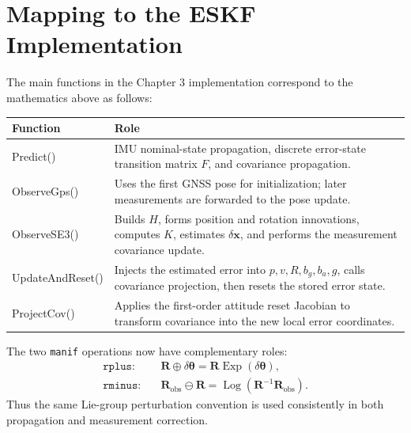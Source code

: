 \documentclass[11pt]{article}
\newcommand{\R}{\mathbf{R}}
\newcommand{\Exp}{\operatorname{Exp}}
\newcommand{\Log}{\operatorname{Log}}
\begin{document}
\section{Mapping to the ESKF Implementation}
The main functions in the Chapter 3 implementation correspond to the mathematics above as follows:
\begin{center}
\begin{tabular}{>{\ttfamily}l p{}}
\toprule
\textnormal{Function} & \textnormal{Role}\\
\midrule
Predict() & IMU nominal-state propagation, discrete error-state transition matrix $F$, and covariance propagation.\\
ObserveGps() & Uses the first GNSS pose for initialization; later measurements are forwarded to the pose update.\\
ObserveSE3() & Builds $H$, forms position and rotation innovations, computes $K$, estimates $\delta\bm x$, and performs the measurement covariance update.\\
UpdateAndReset() & Injects the estimated error into $p,v,R,b_g,b_a,g$, calls covariance projection, then resets the stored error state.\\
ProjectCov() & Applies the first-order attitude reset Jacobian to transform covariance into the new local error coordinates.\\
\bottomrule
\end{tabular}
\end{center}

The two \texttt{manif} operations now have complementary roles:
\begin{align}
\texttt{rplus}:\quad &\R\oplus\delta\bm\theta
=\R\Exp(\delta\bm\theta),\\
\texttt{rminus}:\quad &\R_{\mathrm{obs}}\ominus\R
=\Log(\R^{-1}\R_{\mathrm{obs}}).
\end{align}
Thus the same Lie-group perturbation convention is used consistently in both propagation and measurement correction.
\end{document}
